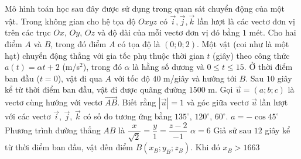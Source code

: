 \begin{ex}%
	Mô hình toán học sau đây được sử dụng trong quan sát chuyển động của một vật. Trong không gian cho hệ tọa độ $Oxyz$ có $\overrightarrow{i}, \overrightarrow{j}, \overrightarrow{k}$ lần lượt là các vectơ đơn vị trên các trục $Ox$, $Oy$, $Oz$ và độ dài của mỗi vectơ đơn vị đó bằng $1$ mét. Cho hai điểm $A$ và $B$, trong đó điểm $A$ có tọa độ là $(0;0;2)$. Một vật (coi như là một hạt) chuyển động thẳng với gia tốc phụ thuộc thời gian $t$ (giây) theo công thức $a(t) = \alpha t + 2$ (m/s$^2$), trong đó $\alpha$ là hằng số dương và $0 \le t \le 15$. Ở thời điểm ban đầu ($t=0$), vật đi qua $A$ với tốc độ $40$ m/giây và hướng tới $B$. Sau $10$ giây kể từ thời điểm ban đầu, vật đi được quãng đường $1500$ m. Gọi $\overrightarrow{u}=(a;b;c)$ là vectơ cùng hướng với vectơ $\overrightarrow{AB}$. Biết rằng $|\overrightarrow{u}|=1$ và góc giữa vectơ $\overrightarrow{u}$ lần lượt với các vectơ $\overrightarrow{i}$, $\overrightarrow{j}$, $\overrightarrow{k}$ có số đo tương ứng bằng $135^\circ$, $120^\circ$, $60^\circ$.
	\choiceTF
	{\True $a=-\cos 45^\circ$}
	{\True Phương trình đường thẳng $AB$ là $\dfrac{x}{\sqrt{2}}=\dfrac{y}{1}=\dfrac{z-2}{-1}$}
	{\True $\alpha=6$}
	{Giả sử sau $12$ giây kể từ thời điểm ban đầu, vật đến điểm $B(x_B;y_B;z_B)$. Khi đó $x_B >1663 $}
\end{ex}
